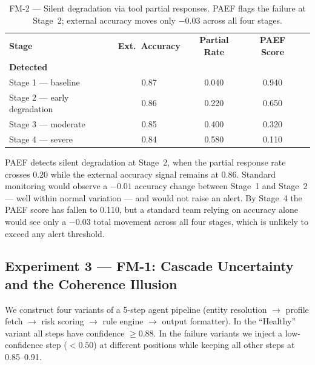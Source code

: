 \documentclass{article}
\newcommand{\yes}{\ding{51}}     %
\newcommand{\no}{\ding{55}}      %
\begin{document}
\begin{table}[t]
  \centering
  \caption{FM-2 --- Silent degradation via tool partial responses.  PAEF
    flags the failure at Stage~2; external accuracy moves only $-0.03$
    across all four stages.}
  \label{tab:exp-fm2}
  \small
  \renewcommand{\arraystretch}{1.2}
  \begin{tabular}{lcccc}
    \toprule
    \textbf{Stage} & \textbf{Ext.\ Accuracy} & \textbf{Partial Rate} & \textbf{PAEF Score} & \makecell[c]{\textbf{Silent Degrad.}\\\textbf{Detected}} \\
    \midrule
    Stage 1 --- baseline          & 0.87 & 0.040 & 0.940 & \no  \\
    Stage 2 --- early degradation & 0.86 & 0.220 & 0.650 & \yes \\
    Stage 3 --- moderate          & 0.85 & 0.400 & 0.320 & \yes \\
    Stage 4 --- severe            & 0.84 & 0.580 & 0.110 & \yes \\
    \bottomrule
  \end{tabular}
\end{table}

PAEF detects silent degradation at Stage~2, when the partial response rate
crosses 0.20 while the external accuracy signal remains at 0.86.  Standard
monitoring would observe a $-0.01$ accuracy change between Stage~1 and
Stage~2 --- well within normal variation --- and would not raise an alert.
By Stage~4 the PAEF score has fallen to 0.110, but a standard team relying
on accuracy alone would see only a $-0.03$ total movement across all four
stages, which is unlikely to exceed any alert threshold.

\subsection{Experiment 3 — FM-1: Cascade Uncertainty and the Coherence Illusion}
\label{sec:exp-fm1}

We construct four variants of a 5-step agent pipeline
(entity resolution $\to$ profile fetch $\to$ risk scoring $\to$ rule engine
$\to$ output formatter).  In the ``Healthy'' variant all steps have
confidence $\geq 0.88$.  In the failure variants we inject a low-confidence
step ($<0.50$) at different positions while keeping all other steps
at 0.85--0.91.
\end{document}

